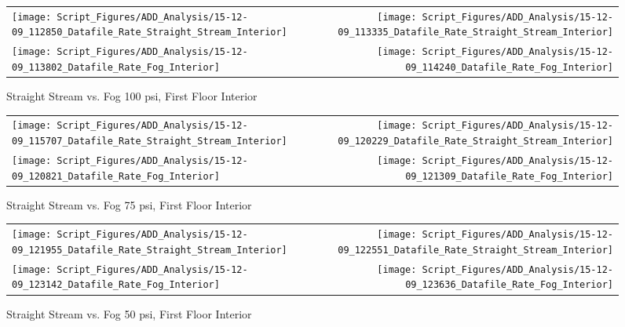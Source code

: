 \documentclass[12pt,oneside]{book}
\begin{document}
\clearpage

\begin{figure}[ht]
\begin{tabular*}{\textwidth}{lr}
\texttt{[image: Script\_Figures/ADD\_Analysis/15-12-09\_112850\_Datafile\_Rate\_Straight\_Stream\_Interior]} &
\texttt{[image: Script\_Figures/ADD\_Analysis/15-12-09\_113335\_Datafile\_Rate\_Straight\_Stream\_Interior]} \\
\texttt{[image: Script\_Figures/ADD\_Analysis/15-12-09\_113802\_Datafile\_Rate\_Fog\_Interior]} &
\texttt{[image: Script\_Figures/ADD\_Analysis/15-12-09\_114240\_Datafile\_Rate\_Fog\_Interior]} \\
\end{tabular*}
\caption{Straight Stream vs. Fog 100 psi, First Floor Interior}
\label{fig:Straight Stream vs. Fog 100 psi, First Floor Interior}
\end{figure}

\clearpage

\begin{figure}[ht]
\begin{tabular*}{\textwidth}{lr}
\texttt{[image: Script\_Figures/ADD\_Analysis/15-12-09\_115707\_Datafile\_Rate\_Straight\_Stream\_Interior]} &
\texttt{[image: Script\_Figures/ADD\_Analysis/15-12-09\_120229\_Datafile\_Rate\_Straight\_Stream\_Interior]} \\
\texttt{[image: Script\_Figures/ADD\_Analysis/15-12-09\_120821\_Datafile\_Rate\_Fog\_Interior]} &
\texttt{[image: Script\_Figures/ADD\_Analysis/15-12-09\_121309\_Datafile\_Rate\_Fog\_Interior]} \\
\end{tabular*}
\caption{Straight Stream vs. Fog 75 psi, First Floor Interior}
\label{fig:Straight Stream vs. Fog 75 psi, First Floor Interior}
\end{figure}

\clearpage

\begin{figure}[ht]
\begin{tabular*}{\textwidth}{lr}
\texttt{[image: Script\_Figures/ADD\_Analysis/15-12-09\_121955\_Datafile\_Rate\_Straight\_Stream\_Interior]} &
\texttt{[image: Script\_Figures/ADD\_Analysis/15-12-09\_122551\_Datafile\_Rate\_Straight\_Stream\_Interior]} \\
\texttt{[image: Script\_Figures/ADD\_Analysis/15-12-09\_123142\_Datafile\_Rate\_Fog\_Interior]} &
\texttt{[image: Script\_Figures/ADD\_Analysis/15-12-09\_123636\_Datafile\_Rate\_Fog\_Interior]} \\
\end{tabular*}
\caption{Straight Stream vs. Fog 50 psi, First Floor Interior}
\label{fig:Straight Stream vs. Fog 50 psi, First Floor Interior}
\end{figure}
\end{document}
